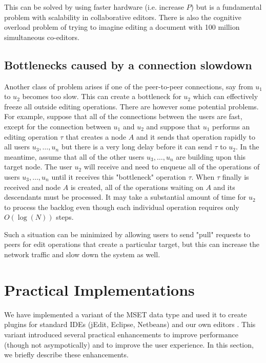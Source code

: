 \documentclass{amsart}
\begin{document}
This can be solved by using faster hardware (i.e. increase $P$) but is a fundamental
problem with scalability in collaborative editors.  There is also the cognitive overload problem of trying to imagine editing a document with 100 million simultaneous co-editors.   

\subsection{Bottlenecks caused by a connection slowdown}
Another class of problem arises if one of the peer-to-peer connections, say from $u_1$ to $u_2$ becomes too slow. This can create a bottleneck for $u_2$ which
can effectively freeze all outside editing operations. 
There are however some potential problems. For example, suppose that all of the connections between the users are fast, except for the connection between $u_1$
and $u_2$ and suppose that $u_1$ performs 
an editing operation $\tau$ that creates a node $A$ and it sends that operation rapidly to
all users $u_3,\ldots,u_n$ but there is a very long delay before it can send $\tau$ to $u_2$.  In the meantime, assume that
all of the other users $u_3,\ldots,u_n$ are building upon
this target node. The user $u_2$ will receive and need to enqueue all of the operations of users $u_3,\ldots, u_n$ until it receives this "bottleneck" operation $\tau$. When $\tau$ finally is
received and node $A$ is created, all of the operations waiting on $A$ and its descendants must be processed.  It may take a substantial amount of time for $u_2$ to process the backlog
even though each individual operation requires only $O(\log(N))$ steps.  

Such a situation can be minimized by allowing users to send "pull" requests to peers for edit operations that create a particular target, but this can increase the network traffic and slow down the system as well.


\section{Practical Implementations}
We have implemented a variant of the MSET data type and used it to create plugins for standard IDEs (jEdit, Eclipse, Netbeans) and our own editors \cite{granville_collabed:_2009}.  This variant introduced several
practical enhancements to improve performance (though not asympotically)
and to improve the user experience.  In this section, we briefly describe these
enhancements.
\end{document}
